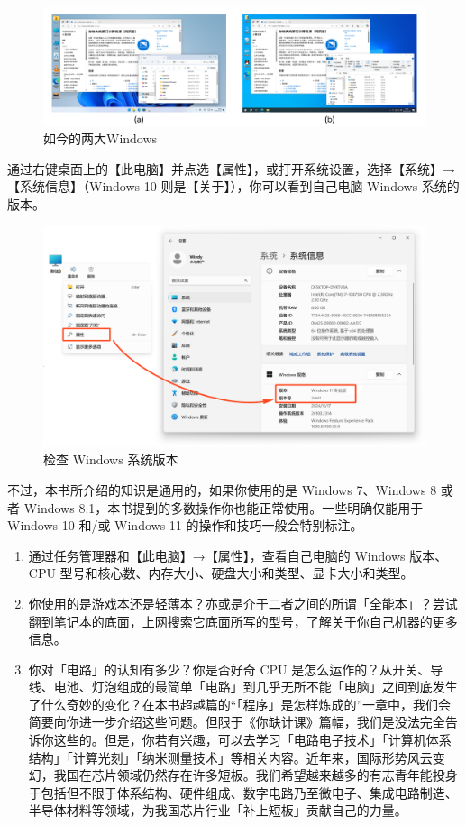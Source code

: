 \begin{figure}[htb!]
  \centering
  \includegraphics[width=.9\textwidth]{assets/basic/Win_11_and_10.pdf}
  \caption{如今的两大Windows}
  \label{fig:Win_11_and_10}
\end{figure}

通过右键桌面上的【此电脑】并点选【属性】，或打开系统设置，选择【系统】→【系统信息】（Windows 10 则是【关于】），你可以看到自己电脑 Windows 系统的版本。

\begin{figure}[htb!]
  \centering
  \includegraphics[width=.7\textwidth]{assets/basic/Check_Windows_version.png}
  \caption{检查 Windows 系统版本}
  \label{fig:check-windows-version}
\end{figure}

不过，本书所介绍的知识是通用的，如果你使用的是 Windows 7、Windows 8 或者 Windows 8.1，本书提到的多数操作你也能正常使用。一些明确仅能用于 Windows 10 和/或 Windows 11 的操作和技巧一般会特别标注。

\practice

\begin{enumerate}
  \item 通过任务管理器和【此电脑】→【属性】，查看自己电脑的 Windows 版本、CPU 型号和核心数、内存大小、硬盘大小和类型、显卡大小和类型。
  \item 你使用的是游戏本还是轻薄本？亦或是介于二者之间的所谓「全能本」？尝试翻到笔记本的底面，上网搜索它底面所写的型号，了解关于你自己机器的更多信息。
  \item 你对「电路」的认知有多少？你是否好奇 CPU 是怎么运作的？从开关、导线、电池、灯泡组成的最简单「电路」到几乎无所不能「电脑」之间到底发生了什么奇妙的变化？在本书超越篇的“「程序」是怎样炼成的”一章中，我们会简要向你进一步介绍这些问题。但限于《你缺计课》篇幅，我们是没法完全告诉你这些的。但是，你若有兴趣，可以去学习「电路电子技术」「计算机体系结构」「计算光刻」「纳米测量技术」等相关内容。近年来，国际形势风云变幻，我国在芯片领域仍然存在许多短板。我们希望越来越多的有志青年能投身于包括但不限于体系结构、硬件组成、数字电路乃至微电子、集成电路制造、半导体材料等领域，为我国芯片行业「补上短板」贡献自己的力量。
\end{enumerate}
